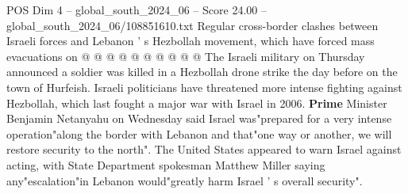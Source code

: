 \begin{textsample}{POS Dim 4 – global\_south\_2024\_06 – Score 24.00 – global\_south\_2024\_06/108851610.txt}
Regular cross-border clashes between Israeli forces and Lebanon ' s Hezbollah movement, which have forced mass evacuations on @ @ @ @ @ @ @ @ @ @ The Israeli military on Thursday announced a soldier was killed in a Hezbollah drone strike the day before on the town of Hurfeish.
Israeli politicians have threatened more intense fighting against Hezbollah, which last fought a major war with Israel in 2006. \textbf{Prime} Minister Benjamin Netanyahu on Wednesday said Israel was"prepared for a very intense operation"along the border with Lebanon and that"one way or another, we will restore security to the north".
The United States appeared to warn Israel against acting, with State Department spokesman Matthew Miller saying any"escalation"in Lebanon would"greatly harm Israel ' s overall security".

\end{textsample}
